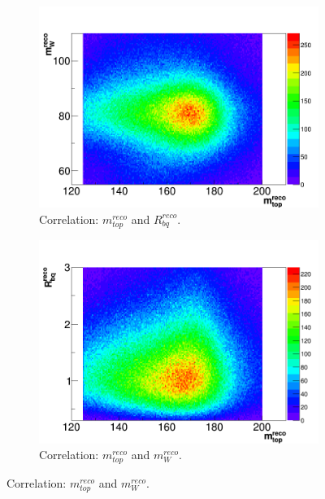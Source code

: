\begin{figure} [h]%
	\centering
	

	\begin{subfigure}{0.35\textwidth}
		\includegraphics[width=\linewidth]{Pics/PlotCombi/mtopmw.png}
		\caption{Correlation: $m_{top}^{reco}$ and $R_{bq}^{reco}$.} \label{fig:1a}
	\end{subfigure}
	\hspace*{0.1cm}
	\begin{subfigure}{0.35\textwidth}
	\includegraphics[width=\linewidth]{Pics/PlotCombi/mtopRbq.png}
	\caption{Correlation:  $m_{top}^{reco}$ and $m_{W}^{reco}$.} \label{fig:1b}
	\end{subfigure}


\end{figure}
